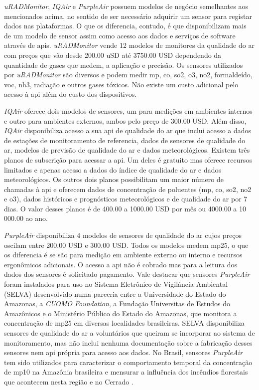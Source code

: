 \textit{uRADMonitor}, \textit{IQAir} e \textit{PurpleAir} possuem modelos de negócio semelhantes aos mencionados acima, no sentido de ser necessário adquirir um sensor para registar dados nas plataformas. O que os diferencia, contudo, é que disponibilizam mais de um modelo de sensor assim como acesso aos dados e serviços de software através de \acrshort{api}s. \textit{uRADMonitor} vende 12 modelos de monitores da qualidade do ar com preços que vão desde 200.00 uSD até 3750.00 USD dependendo da quantidade de gases que medem, a aplicação e precisão. Os sensores utilizados por \textit{uRADMonitor} são diversos e podem medir \acrshort{mp}, \acrshort{co}, \acrshort{so2}, \acrshort{o3}, \acrshort{no2}, formaldeído, \acrshort{voc}, \acrshort{nh3}, radiação e outros gases tóxicos. Não existe um custo adicional pelo acesso à \acrshort{api} além do custo dos dispositivos. 

\textit{IQAir} oferece dois modelos de sensores, um para medições em ambientes internos e outro para ambientes externos, ambos pelo preço de 300.00 USD. Além disso, \textit{IQAir} disponibiliza acesso a sua \acrshort{api} de qualidade do ar que inclui acesso a dados de estações de monitoramento de referencia, dados de sensores de qualidade do ar, modelos de previsão de qualidade do ar e dados meteorológicos. Existem três planos de subscrição para acessar a \acrshort{api}. Um deles é gratuito mas oferece recursos limitados e apenas acesso a dados do índice de qualidade do ar e dados meteorológicos. Os outros dois planos possibilitam um maior número de chamadas à \acrshort{api} e oferecem dados de concentração de poluentes (\acrshort{mp}, \acrshort{co}, \acrshort{so2}, \acrshort{no2} e \acrshort{o3}), dados históricos e prognósticos meteorológicos e de qualidade do ar por 7 dias. O valor desses planos é de 400.00 a 1000.00 USD por mês ou 4000.00 a 10 000.00 ao ano.

\textit{PurpleAir} disponibiliza 4 modelos de sensores de qualidade do ar cujos preços oscilam entre 200.00 USD e 300.00 USD. Todos os modelos medem \acrshort{mp25}, o que os diferencia é se são para medição em ambiente externo ou interno e recursos ergonômicos adicionais. O acesso a \acrshort{api} não é cobrado mas para a leitura dos dados dos sensores é solicitado pagamento. Vale destacar que sensores \textit{PurpleAir} foram instalados para uso no Sistema Eletrônico de Vigilância Ambiental (SELVA) \cite{Ribeiro2021} desenvolvido numa parceria entre a Universidade do Estado do Amazonas, a \textit{CUOMO Foundation}, a Fundação Universitas de Estudos do Amazônicos e o Ministério Público do Estado do Amazonas, que monitora a concentração de \acrshort{mp25} em diversas localidades brasileiras. SELVA disponibiliza sensores de qualidade do ar a voluntários que queiram se incorporar ao sistema de monitoramento, mas não inclui nenhuma documentação sobre a fabricação desses sensores nem \acrshort{api} própria para acesso aos dados. No Brasil, sensores \textit{PurpleAir} tem sido utilizados para caracterizar o comportamento temporal da concentração de \acrshort{mp10} na Amazônia brasileira e mensurar a influência dos incêndios florestais que acontecem nesta região e no Cerrado \cite{Jang2023,Connerton2023}.

